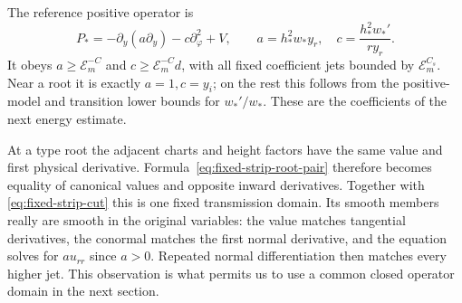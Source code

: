 The reference positive operator is
\[
 P_*=-\partial_y(a\partial_y)-c\partial_\varphi^2+V,
 \qquad a=h_*^2w_*y_r,\quad c=\frac{h_*^2w_*'}{ry_r}.
\]
It obeys $a\ge\mathcal E_m^{-C}$ and
$c\ge\mathcal E_m^{-C}d$, with all fixed coefficient jets bounded
by $\mathcal E_m^{C_s}$. Near a root it is exactly $a=1,c=y_i$;
on the rest this follows from the positive-model and transition lower
bounds for $w_*'/w_*$. These are the coefficients of the next energy
estimate.

At a type root the adjacent charts and height factors have the same
value and first physical derivative. Formula~\eqref{eq:fixed-strip-root-pair}
therefore becomes equality of canonical values and opposite inward
derivatives. Together with \eqref{eq:fixed-strip-cut} this is one
fixed transmission domain. Its smooth members really are smooth in
the original variables: the value matches tangential derivatives,
the conormal matches the first normal derivative, and the equation
solves for $a u_{rr}$ since $a>0$. Repeated normal differentiation
then matches every higher jet. This observation is what permits us
to use a common closed operator domain in the next section.

